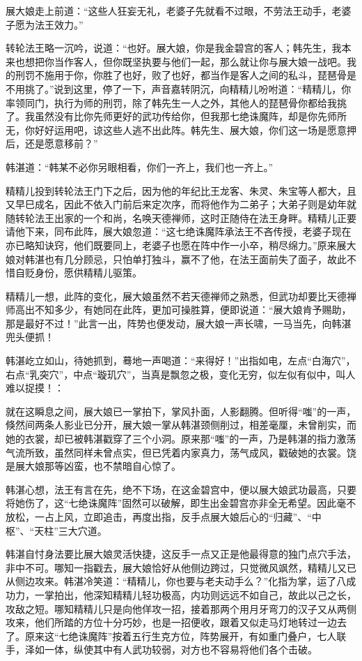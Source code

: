 \documentclass[12pt,oneside]{book}
\begin{document}
展大娘走上前道：``这些人狂妄无礼，老婆子先就看不过眼，不劳法王动手，老婆子愿为法王效力。''

转轮法王略一沉吟，说道：``也好。展大娘，你是我金碧宫的客人；韩先生，我本来也想把你当作客人，但你既坚执要与他们一起，那么就让你与展大娘一战吧。我的刑罚不施用于你，你胜了也好，败了也好，都当作是客人之间的私斗，琵琶骨是不用挑了。''说到这里，停了一下，声音嘉转阴沉，向精精儿吩咐道：``精精儿，你率领同门，执行为师的刑罚，除了韩先生一人之外，其他人的琵琶骨你都给我挑了。我虽然没有比你先师更好的武功传给你，但我那七绝诛魔阵，却是你先师所无，你好好运用吧，谅这些人逃不出此阵。韩先生、展大娘，你们这一场是愿意押后，还是愿意移前？''

韩湛道：``韩某不必你另眼相看，你们一齐上，我们也一齐上。''

精精儿投到转轮法王门下之后，因为他的年纪比王龙客、朱灵、朱宝等人都大，且又早巳成名，因此不依入门前后来定次序，而将他作为二弟子；大弟子则是幼年就随转轮法王出家的一个和尚，名唤天德禅师，这时正随侍在法王身畔。精精儿正要请他下来，同布此阵，展大娘忽道：``这七绝诛魔阵承法王不吝传授，老婆子现在亦已略知诀窍，他们既要同上，老婆子也愿在阵中作一小卒，稍尽绵力。''原来展大娘对韩湛也有几分顾忌，只怕单打独斗，赢不了他，在法王面前失了面子，故此不惜自贬身份，愿供精精儿驱策。

精精儿一想，此阵的变化，展大娘虽然不若天德禅师之熟悉，但武功却要比天德禅师高出不知多少，有她同在此阵，更加可操胜算，便即说道：``展大娘肯予赐助，那是最好不过！''此言一出，阵势也便发动，展大娘一声长啸，一马当先，向韩湛兜头便抓！

韩湛屹立如山，待她抓到，蓦地一声喝道：``来得好！''出指如电，左点``白海穴''，右点``乳突穴''，中点``璇玑穴''，当真是飘忽之极，变化无穷，似左似有似中，叫人难以捉摸！：

就在这瞬息之间，展大娘已一掌拍下，掌风扑面，人影翻腾。但听得``嗤''的一声，倏然间两条人影业已分开，展大娘一掌从韩湛颈侧削过，相差毫厘，未曾削实，而她的衣裳，却已被韩湛戳穿了三个小洞。原来那``嗤''的一声，乃是韩湛的指力激荡气流所致，虽然同样未曾点实，但已凭着内家真力，荡气成风，戳破她的衣裳。饶是展大娘那等凶蛮，也不禁暗自心惊了。

韩湛心想，法王有言在先，绝不下场，在这金碧宫中，便以展大娘武功最高，只要将她伤了，这``七绝诛魔阵''固然可以破解，即生出金碧宫亦非全无希望。因此毫不放松，一占上风，立即追击，再度出指，反手点展大娘后心的``归藏''、``中枢''、``天柱''三大穴道。

韩湛自忖身法要比展大娘灵活快捷，这反手一点又正是他最得意的独门点穴手法，非中不可。哪知一指戳去，展大娘恰好从他侧边跨过，只觉微风飒然，精精儿又已从侧边攻来。韩湛冷笑道：``精精儿，你也要与老夫动手么？''化指为掌，运了八成功力，一掌拍出，他深知精精儿轻功极高，内功则远远不如自己，故此以己之长，攻敌之短。哪知精精儿只是向他佯攻一招，接着那两个用月牙弯刀的汉子又从两侧攻来，他们所踏的方位十分巧妙，也是一招便收，跟着又似走马灯地转过一边去了。原来这``七绝诛魔阵''按着五行生克方位，阵势展开，有如重门叠户，七人联手，泽如一体，纵使其中有人武功较弱，对方也不容易将他们各个击破。
\end{document}
